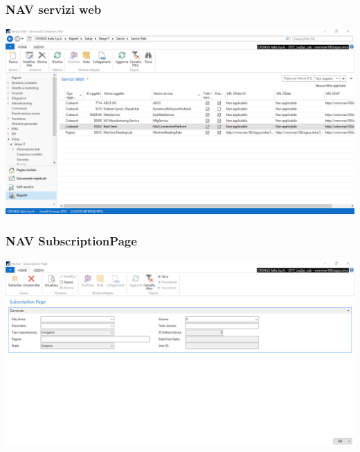 \documentclass{beamer}
\begin{document}



\begin{frame}
\frametitle{NAV servizi web}
\includegraphics[width=1\textwidth]{images/NAVServiziWeb.png}
\end{frame}


\begin{frame}
\frametitle{NAV SubscriptionPage}
\includegraphics[width=1\textwidth]{images/NAVSubscriptionPage.png}
\end{frame}
\end{document}
